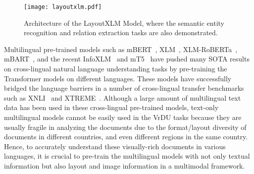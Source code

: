 \documentclass[11pt]{article}
\begin{document}
\begin{figure*}[t]
  \centering
  \texttt{[image: layoutxlm.pdf]}
  \caption{Architecture of the LayoutXLM Model, where the semantic entity recognition and relation extraction tasks are also demonstrated.}
  \label{fig:arch}
\end{figure*}



Multilingual pre-trained models such as mBERT~\citep{devlin2018bert}, XLM~\citep{lample2019crosslingual}, XLM-RoBERTa~\citep{conneau2020unsupervised}, mBART~\citep{liu2020multilingual}, and the recent InfoXLM~\citep{chi2020infoxlm} and mT5~\citep{xue2020mt5} have pushed many SOTA results on cross-lingual natural language understanding tasks by pre-training the Transformer models on different languages. These models have successfully bridged the language barriers in a number of cross-lingual transfer benchmarks such as XNLI~\citep{conneau2018xnli} and XTREME~\citep{hu2020xtreme}. Although a large amount of multilingual text data has been used in these cross-lingual pre-trained models, text-only multilingual models cannot be easily used in the VrDU tasks because they are usually fragile in analyzing the documents due to the format/layout diversity of documents in different countries, and even different regions in the same country. Hence, to accurately understand these visually-rich documents in various languages, it is crucial to pre-train the multilingual models with not only textual information but also layout and image information in a multimodal framework.
\end{document}
